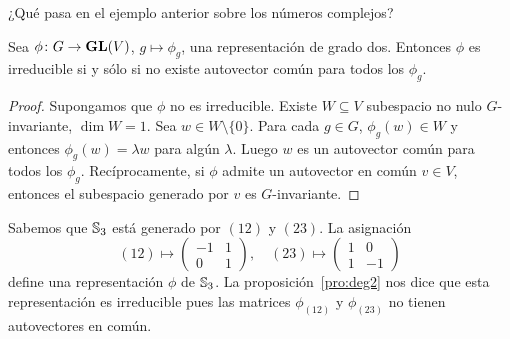 \begin{exercise}
    ¿Qué pasa en el ejemplo anterior sobre los números complejos?
\end{exercise}


\begin{proposition}
  \label{pro:deg2}
  Sea $\phi\colon G\to \mathbf{GL}(V)$, $g\mapsto\phi_g$, una representación de grado dos. Entonces $\phi$ es
  irreducible si y sólo si no existe autovector común para todos los $\phi_g$.
\end{proposition}

\begin{proof}
  Supongamos que $\phi$ no es irreducible. Existe $W\subseteq V$
  subespacio no nulo $G$-invariante, $\dim W=1$. Sea $w\in W\setminus\{0\}$.
  Para cada $g\in G$, $\phi_g(w)\in W$ y entonces $\phi_g(w)=\lambda w$ para
  algún $\lambda$. Luego $w$ es un autovector común para todos los $\phi_g$.
  Recíprocamente, si $\phi$ admite un autovector en común $v\in V$, entonces el
  subespacio generado por $v$ es $G$-invariante.
\end{proof}

\begin{example}
  \label{exa:S3deg2}
  Sabemos que $\mathbb{S}_3$ está generado por $(12)$ y $(23)$. La asignación
  \[(12)\mapsto\begin{pmatrix}
    -1 & 1\\
    0 & 1
  \end{pmatrix},
  \quad
  (23)\mapsto\begin{pmatrix}
    1 & 0\\
    1 & -1
  \end{pmatrix}
  \]
  define una representación $\phi$ de $\mathbb{S}_3$. 
  La proposición~\ref{pro:deg2} nos dice que esta representación 
  es irreducible pues las matrices $\phi_{(12)}$ y $\phi_{(23)}$
  no tienen autovectores en común.

\end{example}

